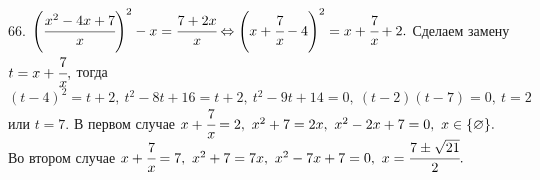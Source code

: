 66. $\left(\cfrac{x^2-4x+7}{x}\right)^2-x=\cfrac{7+2x}{x}\Leftrightarrow\left(x+\cfrac{7}{x}-4\right)^2=x+\cfrac{7}{x}+2.$ Сделаем замену $t=x+\cfrac{7}{x},$ тогда
$(t-4)^2=t+2,\ t^2-8t+16=t+2,\ t^2-9t+14=0,\ (t-2)(t-7)=0,\ t=2$ или $t=7.$ В первом случае $x+\cfrac{7}{x}=2,\ x^2+7=2x,\ x^2-2x+7=0,\ x\in\{\varnothing\}.$ Во втором случае $x+\cfrac{7}{x}=7,\ x^2+7=7x,\ x^2-7x+7=0,\ x=\cfrac{7\pm\sqrt{21}}{2}.$\\
